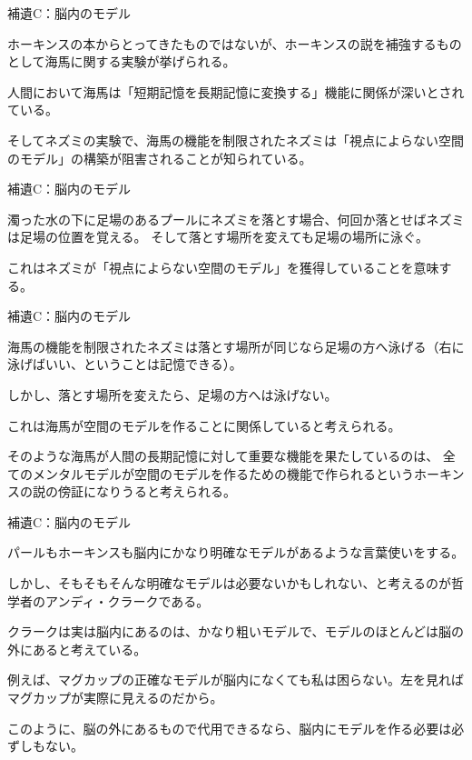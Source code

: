 \documentclass[12pt, unicode]{beamer}
\begin{document}
\begin{frame}{補遺C：脳内のモデル}

ホーキンスの本からとってきたものではないが、ホーキンスの説を補強するものとして海馬に関する実験が挙げられる。

人間において海馬は「短期記憶を長期記憶に変換する」機能に関係が深いとされている。

そしてネズミの実験で、海馬の機能を制限されたネズミは「視点によらない空間のモデル」の構築が阻害されることが知られている。

\end{frame}
\begin{frame}{補遺C：脳内のモデル}

濁った水の下に足場のあるプールにネズミを落とす場合、何回か落とせばネズミは足場の位置を覚える。
そして落とす場所を変えても足場の場所に泳ぐ。

これはネズミが「視点によらない空間のモデル」を獲得していることを意味する。

\end{frame}
\begin{frame}{補遺C：脳内のモデル}

海馬の機能を制限されたネズミは落とす場所が同じなら足場の方へ泳げる（右に泳げばいい、ということは記憶できる）。

しかし、落とす場所を変えたら、足場の方へは泳げない。

これは海馬が空間のモデルを作ることに関係していると考えられる。

そのような海馬が人間の長期記憶に対して重要な機能を果たしているのは、
全てのメンタルモデルが空間のモデルを作るための機能で作られるというホーキンスの説の傍証になりうると考えられる。

\end{frame}

\begin{frame}{補遺C：脳内のモデル}

パールもホーキンスも脳内にかなり明確なモデルがあるような言葉使いをする。

しかし、そもそもそんな明確なモデルは必要ないかもしれない、と考えるのが哲学者のアンディ・クラークである。

クラークは実は脳内にあるのは、かなり粗いモデルで、モデルのほとんどは脳の外にあると考えている。

例えば、マグカップの正確なモデルが脳内になくても私は困らない。左を見ればマグカップが実際に見えるのだから。

このように、脳の外にあるもので代用できるなら、脳内にモデルを作る必要は必ずしもない。

\end{frame}
\end{document}
